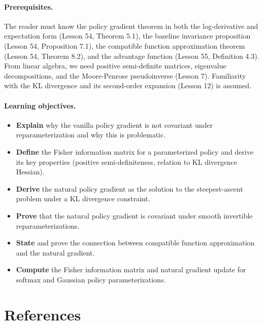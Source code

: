 \documentclass[11pt,a4paper]{article}
\begin{document}
\paragraph{Prerequisites.}
The reader must know the policy gradient theorem in both the
log-derivative and expectation form (Lesson 54, Theorem 5.1), the
baseline invariance proposition (Lesson 54, Proposition 7.1), the
compatible function approximation theorem (Lesson 54, Theorem 8.2), and
the advantage function (Lesson 55, Definition 4.3). From linear algebra,
we need positive semi-definite matrices, eigenvalue decompositions, and
the Moore-Penrose pseudoinverse (Lesson 7). Familiarity with the
KL divergence and its second-order expansion (Lesson 12) is assumed.

\paragraph{Learning objectives.}
\begin{itemize}
  \item \textbf{Explain} why the vanilla policy gradient is not covariant
    under reparameterization and why this is problematic.
  \item \textbf{Define} the Fisher information matrix for a parameterized
    policy and derive its key properties (positive semi-definiteness,
    relation to KL divergence Hessian).
  \item \textbf{Derive} the natural policy gradient as the solution to
    the steepest-ascent problem under a KL divergence constraint.
  \item \textbf{Prove} that the natural policy gradient is covariant
    under smooth invertible reparameterizations.
  \item \textbf{State} and prove the connection between compatible
    function approximation and the natural gradient.
  \item \textbf{Compute} the Fisher information matrix and natural
    gradient update for softmax and Gaussian policy parameterizations.
\end{itemize}

\section{References}
\end{document}
